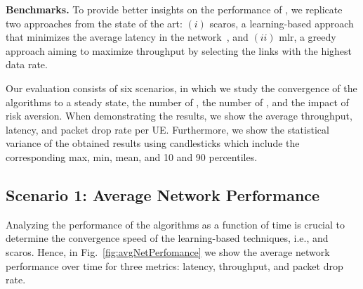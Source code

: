 \begin{table}[t!]
\caption{Simulation parameters.}
\centering
{}\end{table}

\textbf{Benchmarks.} To provide better insights on the performance of \name{}, we replicate two approaches from the state of the art: $(i)$ \gls{scaros}, a learning-based approach that minimizes the average latency in the network~\cite{ortiz2019scaros}, and $(ii)$ \gls{mlr}, a greedy approach aiming to maximize throughput by selecting the links with the highest data rate.


Our evaluation consists of six scenarios, in which we study the convergence of the algorithms to a steady state, the number of \nodes{}, the number of \donors{}, and the impact of risk aversion. When demonstrating the results, we show the average throughput, latency, and packet drop rate per UE. Furthermore, we show the statistical variance of the obtained results using candlesticks which include the corresponding max, min, mean, and 10 and 90 percentiles. 

\subsection{Scenario 1: Average Network Performance}
\label{sub:netPerformance}
Analyzing the performance of the algorithms as a function of time is crucial to determine the convergence speed of the learning-based techniques, i.e.,  \name{} and \gls{scaros}. Hence, in Fig.~\ref{fig:avgNetPerfomance} we show the average network performance over time for three metrics: latency, throughput, and packet drop rate.


